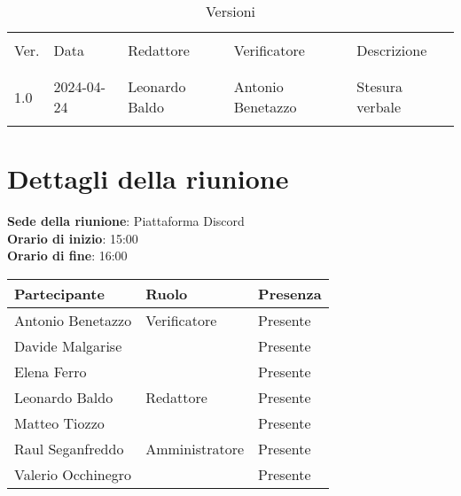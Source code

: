 \documentclass[italian,12pt]{article}
\begin{document}


\newpage



\begin{table}[!h]
	\caption{Versioni}
	\footnotesize
	\begin{center}
		\begin{tabular}{ l l l l l }
			\hline \\[-2ex]
			Ver. & Data       & Redattore      & Verificatore      & Descrizione     \\
			\\[-2ex] \hline \\[-1.5ex]
			1.0  & 2024-04-24 & Leonardo Baldo & Antonio Benetazzo & Stesura verbale \\
			\\[-1.5ex] \hline
		\end{tabular}
	\end{center}
\end{table}

\newpage

\tableofcontents

\newpage

\section{Dettagli della riunione}


\textbf{Sede della riunione}: Piattaforma Discord\\
\textbf{Orario di inizio}: 15:00\\
\textbf{Orario di fine}: 16:00\\


\begin{flushleft}
	\begin{table}[!h]
	\begin{tabular}{ |l|l|l| } 
		\hline
		\textbf{Partecipante} & \textbf{Ruolo}       & \textbf{Presenza} \\
		\hline 
		Antonio Benetazzo     & Verificatore         & Presente          \\
		Davide Malgarise      &                      & Presente          \\
		Elena Ferro           &                      & Presente          \\
		Leonardo Baldo        & Redattore            & Presente          \\
		Matteo Tiozzo         &                      & Presente          \\
		Raul Seganfreddo      & Amministratore       & Presente          \\
		Valerio Occhinegro    &                      & Presente          \\
		\hline
	\end{tabular}
	\end{table}
\end{flushleft}
\end{document}
